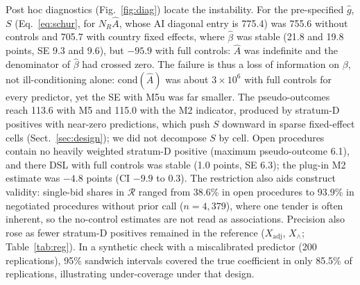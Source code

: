 \documentclass[runningheads]{llncs}
\begin{document}
Post hoc diagnostics (Fig.~\ref{fig:diag}) locate the instability. For the pre-specified $\hat{g}$, $S$ (Eq.~\eqref{eq:schur}, for $N_R\hat{A}$, whose AI diagonal entry is 775.4) was 755.6 without controls and 705.7 with country fixed effects, where $\hat\beta$ was stable (21.8 and 19.8 points, SE 9.3 and 9.6), but $-95.9$ with full controls: $\hat{A}$ was indefinite and the denominator of $\hat\beta$ had crossed zero. The failure is thus a loss of information on $\beta$, not ill-conditioning alone: $\mathrm{cond}(\hat{A})$ was about $3\times10^6$ with full controls for every predictor, yet the SE with M5u was far smaller. The pseudo-outcomes reach 113.6 with M5 and 115.0 with the M2 indicator, produced by stratum-D positives with near-zero predictions, which push $S$ downward in sparse fixed-effect cells (Sect.~\ref{sec:design}); we did not decompose $S$ by cell. Open procedures contain no heavily weighted stratum-D positive (maximum pseudo-outcome 6.1), and there DSL with full controls was stable (1.0 points, SE 6.3); the plug-in M2 estimate was $-4.8$ points (CI $-9.9$ to 0.3). The restriction also aids construct validity: single-bid shares in $\mathcal{R}$ ranged from 38.6\% in open procedures to 93.9\% in negotiated procedures without prior call ($n=4{,}379$), where one tender is often inherent, so the no-control estimates are not read as associations. Precision also rose as fewer stratum-D positives remained in the reference ($X_{\mathrm{adj}}$, $X_\wedge$; Table~\ref{tab:reg}). In a synthetic check with a miscalibrated predictor (200 replications), 95\% sandwich intervals covered the true coefficient in only 85.5\% of replications, illustrating under-coverage under that design.
\end{document}
